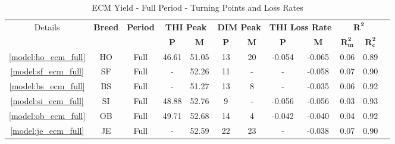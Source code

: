 \begin{table}[htbp]
    \centering
    \begin{tabular}{c c c c c c c c c c c c}
        \toprule
        \multirow{2}{*}{Details} &
        \multirow{2}{*}{\textbf{Breed}} &
        \multirow{2}{*}{\textbf{Period}} &
        \multicolumn{2}{c}{\textbf{THI Peak}} &
        \multicolumn{2}{c}{\textbf{DIM Peak}} &
        \multicolumn{2}{c}{\textbf{THI Loss Rate}} &
        \multicolumn{2}{c}{$\mathbf{R^2}$} \\
        \cmidrule(lr){4-5} \cmidrule(lr){6-7} \cmidrule(lr){8-9} \cmidrule(lr){10-11}
        & & &
        \textbf{P} & \textbf{M} &
        \textbf{P} & \textbf{M} &
        \textbf{P} & \textbf{M} &
        $\mathbf{R^2_m}$ & $\mathbf{R^2_c}$ & \\
        \hline
        \hline
        \textcolor{blue}{\ref{model:ho_ecm_full}}& HO & Full & 46.61 & 51.05 & 13 & 20 & -0.054 & -0.065 & 0.06 & 0.89\\
        \textcolor{blue}{\ref{model:sf_ecm_full}}& SF & Full & - & 52.26 & 11 & - & - & -0.058 & 0.07 & 0.90\\
        \textcolor{blue}{\ref{model:bs_ecm_full}}& BS & Full & - & 51.27 & 13 & 8 & - & -0.035 & 0.06 & 0.92\\
        \textcolor{blue}{\ref{model:si_ecm_full}}& SI & Full & 48.88 & 52.76 & 9 & - & -0.056 & -0.056 & 0.03 & 0.93\\
        \textcolor{blue}{\ref{model:ob_ecm_full}}& OB & Full & 49.71 & 52.68 & 14 & 4 & -0.042 & -0.040 & 0.04 & 0.92\\
        \textcolor{blue}{\ref{model:je_ecm_full}}& JE & Full & - & 52.59 & 22 & 23 & - & -0.038 & 0.07 & 0.90\\
        \bottomrule
    \end{tabular}
    \caption{ECM Yield - Full Period - Turning Points and Loss Rates}
    \label{table:ecm_yield_full_period}
\end{table}

